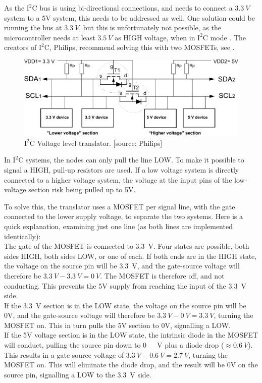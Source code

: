 As the $\text{I}^2\text{C}$ bus is using bi-directional connections, and needs to connect a $\SI{3,3}{V}$ system to a 5V system, this needs to be addressed as well. One solution could be running the bus at $\SI{3,3}{V}$, but this is unfortunately not possible, as the microcontroller needs at least $\SI{3,5}{V}$ as HIGH voltage, when in  $\text{I}^2\text{C}$ mode \cite{Atmega}. The creators of $\text{I}^2\text{C}$, Philips, recommend solving this with two MOSFETs, see .

\begin{figure}[H]
	\centering
	\includegraphics[scale=0.9]{figures/i2cLevel.pdf}
	\caption{$\text{I}^2\text{C}$ Voltage level translator. [source: Philips]}
	\label{i2clevel}
\end{figure}


In $\text{I}^2\text{C}$ systems, the nodes can only pull the line LOW. To make it possible to signal a HIGH, pull-up resistors are used. If a low voltage system is directly connected to a higher voltage system, the voltage at the input pins of the low-voltage section risk being pulled up to 5V.

To solve this, the translator uses a MOSFET per signal line, with the gate connected to the lower supply voltage, to separate the two systems. Here is a quick explanation, examining just one line (as both lines are implemented identically):\\
%
The gate of the MOSFET is connected to \SI{3,3}{V}.
Four states are possible, both sides HIGH, both sides LOW, or one of each.
If both ends are in the HIGH state, the voltage on the source pin will be \SI{3,3}{V}, and the gate-source voltage will therefore be $\SI{3,3}{V}-\SI{3,3}{V}=\SI{0}{V}$. The MOSFET is therefore off, and not conducting. This prevents the 5V supply from reaching the input of the \SI{3,3}{V} side.\\
If the \SI{3,3}{V} section is in the LOW state, the voltage on the source pin will be 0V, and the gate-source voltage will therefore be $\SI{3,3}{V}-\SI{0}{V}=\SI{3,3}{V}$, turning the MOSFET on. This in turn pulls the 5V section to 0V, signalling a LOW.\\
If the 5V voltage section is in the LOW state, the intrinsic diode in the MOSFET will conduct, pulling the source pin down to \si{0\ V} plus a diode drop ($\approx\SI{0,6}{V}$). This results in a gate-source voltage of $\SI{3,3}{V}-\SI{0,6}{V}=\SI{2,7}{V}$, turning the MOSFET on. This will eliminate the diode drop, and the result will be 0V on the source pin, signalling a LOW to the \SI{3,3}{V} side.

